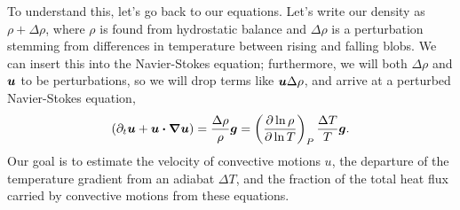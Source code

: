 To understand this, let's go back to our equations.  Let's write our density as $\rho + \Delta\rho$, where $\rho$ is found from hydrostatic balance and $\Delta\rho$ is a perturbation stemming from differences in temperature between rising and falling blobs.   We can insert this into the Navier-Stokes equation; furthermore, we will both $\Delta\rho$ and $\boldsymbol{u}$ to be perturbations, so we will drop terms like $\boldsymbol{u}\Delta \rho$, and arrive at a perturbed Navier-Stokes equation,
\begin{equation}\label{e.perturbed-navier-stokes}
 (\partial_{t}\boldsymbol{u} + \boldsymbol{u}\boldsymbol{\cdot}\boldsymbol{\nabla}\boldsymbol{u}) = \frac{\Delta\rho}{\rho}\boldsymbol{g} = \left(\frac{\partial\ln\rho}{\partial\ln T}\right)_{P}\frac{\Delta T}{T}\boldsymbol{g}.
 \end{equation}
Our goal is to estimate the velocity of convective motions $u$, the departure of the temperature gradient from an adiabat $\Delta T$, and the fraction of the total heat flux carried by convective motions from these equations.

